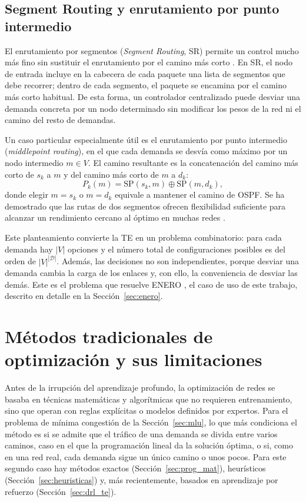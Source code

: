 \subsection{Segment Routing y enrutamiento por punto intermedio}\label{sec:sr}

El enrutamiento por segmentos (\textit{Segment Routing}, SR) permite un control mucho más fino sin sustituir el enrutamiento por el camino más corto \cite{rfc8402}. En SR, el nodo de entrada incluye en la cabecera de cada paquete una lista de segmentos que debe recorrer; dentro de cada segmento, el paquete se encamina por el camino más corto habitual. De esta forma, un controlador centralizado puede desviar una demanda concreta por un nodo determinado sin modificar los pesos de la red ni el camino del resto de demandas.

Un caso particular especialmente útil es el enrutamiento por punto intermedio (\textit{middlepoint routing}), en el que cada demanda se desvía como máximo por un nodo intermedio $m \in V$. El camino resultante es la concatenación del camino más corto de $s_k$ a $m$ y del camino más corto de $m$ a $d_k$:
\begin{equation}
	P_k(m) = \mathrm{SP}(s_k, m) \oplus \mathrm{SP}(m, d_k),
\end{equation}
donde elegir $m = s_k$ o $m = d_k$ equivale a mantener el camino de OSPF. Se ha demostrado que las rutas de dos segmentos ofrecen flexibilidad suficiente para alcanzar un rendimiento cercano al óptimo en muchas redes \cite{bhatia2015optimized}.

Este planteamiento convierte la TE en un problema combinatorio: para cada demanda hay $|V|$ opciones y el número total de configuraciones posibles es del orden de $|V|^{|\mathcal{D}|}$. Además, las decisiones no son independientes, porque desviar una demanda cambia la carga de los enlaces y, con ello, la conveniencia de desviar las demás. Este es el problema que resuelve ENERO \cite{ALMASAN2022109166}, el caso de uso de este trabajo, descrito en detalle en la Sección~\ref{sec:enero}.

\section{Métodos tradicionales de optimización y sus limitaciones}\label{sec:metodos_trad}

Antes de la irrupción del aprendizaje profundo, la optimización de redes se basaba en técnicas matemáticas y algorítmicas que no requieren entrenamiento, sino que operan con reglas explícitas o modelos definidos por expertos. Para el problema de mínima congestión de la Sección~\ref{sec:mlu}, lo que más condiciona el método es si se admite que el tráfico de una demanda se divida entre varios caminos, caso en el que la programación lineal da la solución óptima, o si, como en una red real, cada demanda sigue un único camino o unos pocos. Para este segundo caso hay métodos exactos (Sección~\ref{sec:prog_mat}), heurísticos (Sección~\ref{sec:heuristicas}) y, más recientemente, basados en aprendizaje por refuerzo (Sección~\ref{sec:drl_te}).

